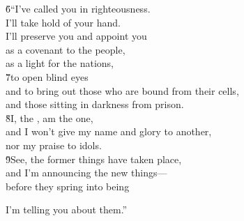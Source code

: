 \begin{poetry}
\poeml \v{6}``I've called you in righteousness. \\
\poemll    I'll take hold of your hand. \\
\poeml I'll preserve you and appoint you \\
\poemll    as a covenant to the people, \\
\poemlll       as a light for the nations, \\
\poeml \v{7}to open blind eyes \\
\poemll    and to bring out those who are bound from their cells, \\
\poemlll       and those sitting in darkness from prison. \\
\poeml \v{8}I, the , am the one, \\
\poemll    and I won't give my name and glory to another, \\
\poemlll       nor my praise to idols. \\
\poeml \v{9}See, the former things have taken place, \\
\poemll    and I'm announcing the new things--- \\
\poeml before they spring into being
\end{poetry}

I'm telling you about them.''

